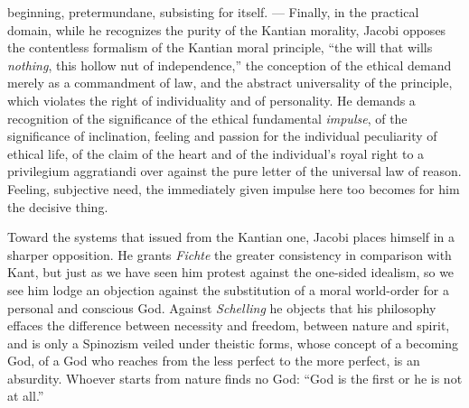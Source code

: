 beginning, pretermundane, subsisting for itself. --- Finally, in the
practical domain, while he recognizes the purity of the Kantian
morality, Jacobi opposes the contentless formalism of the Kantian moral
principle, ``the will that wills \emph{nothing}, this hollow nut of
independence,'' the conception of the ethical demand merely as a
commandment of law, and the abstract universality of the principle,
which violates the right of individuality and of personality. He
demands a recognition of the significance of the ethical fundamental
\emph{impulse}, of the significance of inclination, feeling and passion
for the individual peculiarity of ethical life, of the claim of the
heart and of the individual's royal right to a privilegium aggratiandi
over against the pure letter of the universal law of reason. Feeling,
subjective need, the immediately given impulse here too becomes for him
the decisive thing.

Toward the systems that issued from the Kantian one, Jacobi
places himself in a sharper opposition. He grants \emph{Fichte} the
greater consistency in comparison with Kant, but just as we have seen
him protest against the one-sided idealism, so we see him lodge an
objection against the substitution of a moral world-order for a
personal and conscious God. Against \emph{Schelling} he objects that
his philosophy effaces the difference between necessity and freedom,
between nature and spirit, and is only a Spinozism veiled under
theistic forms, whose concept of a becoming God, of a God who reaches
from the less perfect to the more perfect, is an absurdity. Whoever
starts from nature finds no God: ``God is the first or he is not at
all.''

\divrule

